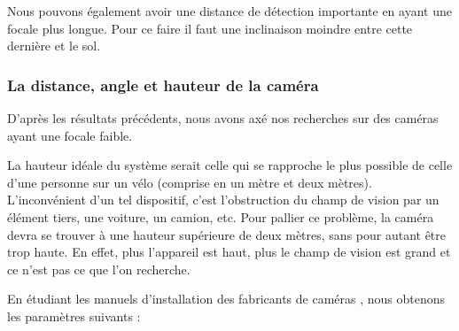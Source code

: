 Nous pouvons également avoir une distance de détection importante en ayant une focale plus longue. Pour ce faire il faut une inclinaison moindre entre cette dernière et le sol.


\subsubsection{La distance, angle et hauteur de la caméra}
\label{sec:camera_distance}
D'après les résultats précédents, nous avons axé nos recherches sur des caméras ayant une focale faible.

La hauteur idéale du système serait celle qui se rapproche le plus possible de celle d'une personne sur un vélo (comprise en un mètre et deux mètres).
L'inconvénient d'un tel dispositif, c'est l'obstruction du champ de vision par un élément tiers, une voiture, un camion, etc. Pour pallier ce problème,
la caméra devra se trouver à une hauteur supérieure de deux mètres, sans pour autant être trop haute. En effet, plus l'appareil est haut,
plus le champ de vision est grand et ce n'est pas ce que l'on recherche.

En étudiant les manuels d'installation des fabricants de caméras \cite{ganz}, nous obtenons les paramètres suivants :

